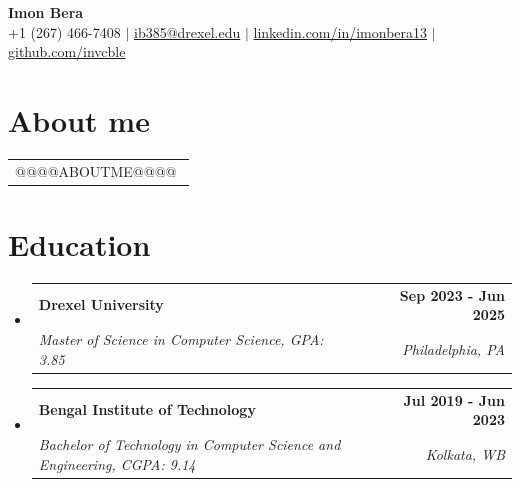 \documentclass[letterpaper,10pt]{article}
\makeatletter
\newcommand{\ResumeSubheadingVspace}{-10pt}
\newcommand{\resumeSubheading}[4]{
  \vspace{0pt}\item
    \begin{tabular*}{0.97\textwidth}[t]{l@{\extracolsep{\fill}}r}
      \textbf{#1} & \textbf{#2} \\[-2pt]
      \textit{\small #3} & \textit{\small #4} \\[+2pt]
    \end{tabular*}\vspace{\ResumeSubheadingVspace}
}
\newcommand{\resumeSubHeadingListStart}{\begin{itemize}[leftmargin=0.15in, label={}]}
\newcommand{\resumeSubHeadingListEnd}{\end{itemize}}
\makeatother
\begin{document}
\begin{center}
    \textbf{\Huge  Imon Bera} \\ \vspace{1pt}
    \small +1 (267) 466-7408 $|$ 
    \href{mailto:ib385@drexel.edu}{ib385@drexel.edu} $|$ 
    \href{https://www.linkedin.com/in/imonbera13/}{{linkedin.com/in/imonbera13}} $|$
    \href{https://github.com/invcble}{{github.com/invcble}\vspace{-10pt}}
\end{center}


\section{About me}
  \vspace{0.2em}
    \hspace{0.15in}\begin{tabular}{p{0.97\linewidth}}
    @@@@ABOUTME@@@@
\end{tabular}


\section{Education}
\resumeSubHeadingListStart
  \resumeSubheading
    {Drexel University}{Sep 2023 - Jun 2025}
    {Master of Science in Computer Science, GPA: 3.85}{Philadelphia, PA}
  \resumeSubheading
    {Bengal Institute of Technology}{Jul 2019 - Jun 2023}
    {Bachelor of Technology in Computer Science and Engineering, CGPA: 9.14}{Kolkata, WB}
\resumeSubHeadingListEnd

\vspace{-5pt}


\end{document}
